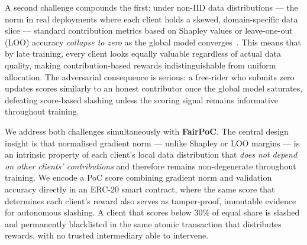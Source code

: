 \documentclass[journal]{IEEEtran}
\theoremstyle{definition}
\theoremstyle{remark}
\begin{document}
A second challenge compounds the first: under non-IID data
distributions --- the norm in real deployments where each client holds
a skewed, domain-specific data slice --- standard contribution metrics
based on Shapley values or leave-one-out (LOO) accuracy
\emph{collapse to zero} as the global model
converges~\cite{poshapley2023}.
This means that by late training, every client looks equally
valuable regardless of actual data quality, making contribution-based
rewards indistinguishable from uniform allocation.
The adversarial consequence is serious: a free-rider who submits zero
updates scores similarly to an honest contributor once the global
model saturates, defeating score-based slashing unless the scoring
signal remains informative throughout training.

We address both challenges simultaneously with \textbf{FairPoC}.
The central design insight is that normalised gradient norm ---
unlike Shapley or LOO margins --- is an intrinsic property of each
client's local data distribution that \emph{does not depend on other
clients' contributions} and therefore remains non-degenerate throughout
training.
We encode a PoC score combining gradient norm and validation accuracy
directly in an ERC-20 smart contract, where the same score that
determines each client's reward also serves as tamper-proof,
immutable evidence for autonomous slashing.
A client that scores below $30\%$ of equal share is slashed and
permanently blacklisted in the same atomic transaction that distributes
rewards, with no trusted intermediary able to intervene.
\end{document}
